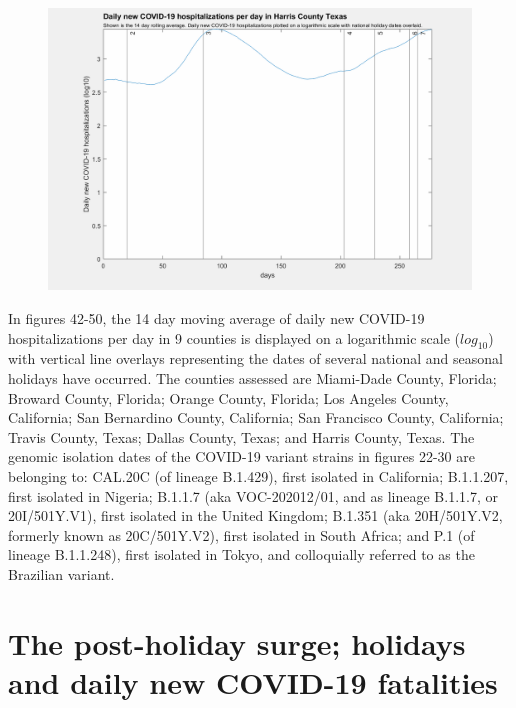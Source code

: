 \documentclass[]{article}
\begin{document}
\begin{figure}[!h]
	\includegraphics[width=\linewidth]{images/harris_hospitalizations_holiday_log.png}
	\caption{}
	\label{fig:images/harris_hospitalizations_holiday_logLabel}
\end{figure}

\FloatBarrier

In figures 42-50, the 14 day moving average of daily new COVID-19 hospitalizations per day in 9 counties is displayed on a logarithmic scale ($log_{10}$) with vertical line overlays representing the dates of several national and seasonal holidays have occurred. The counties assessed are Miami-Dade County, Florida; Broward County, Florida; Orange County, Florida; Los Angeles County, California; San Bernardino County, California; San Francisco County, California; Travis County, Texas; Dallas County, Texas; and Harris County, Texas. The genomic isolation dates of the COVID-19 variant strains in figures 22-30 are belonging to: CAL.20C (of lineage B.1.429), first isolated in California; B.1.1.207, first isolated in Nigeria; B.1.1.7 (aka VOC-202012/01, and as lineage B.1.1.7, or 20I/501Y.V1), first isolated in the United Kingdom; B.1.351 (aka 20H/501Y.V2, formerly known as 20C/501Y.V2), first isolated in South Africa; and P.1 (of lineage B.1.1.248), first isolated in Tokyo, and colloquially referred to as the Brazilian variant.


\FloatBarrier
\vspace{5mm}

\section*{The post-holiday surge; holidays and daily new COVID-19 fatalities}
\end{document}
